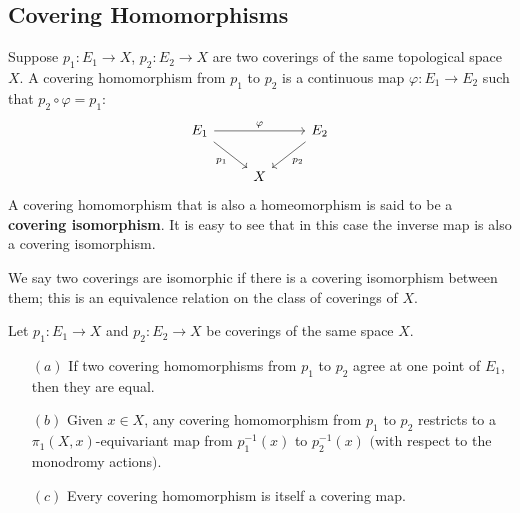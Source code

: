 \subsection{Covering Homomorphisms}
Suppose $p_1:E_1\to X$, $p_2:E_2\to X$ are two coverings of the same topological
space $X$. A covering homomorphism from $p_1$ to $p_2$ is a continuous map $\varphi:E_1\to E_2$ such that $p_2\circ\varphi=p_1$:
\[\begin{tikzcd}
E_1\ar[rd,swap,"p_1"]\ar[rr,"\varphi"]&&E_2\ar[ld,"p_2"]\\
&X&
\end{tikzcd}\]
A covering homomorphism that is also a homeomorphism is said to be a \textbf{covering
isomorphism}. It is easy to see that in this case the inverse map is also a covering isomorphism.\par
We say two coverings are isomorphic if there is a covering isomorphism between them; this is an equivalence relation on the class of coverings of $X$.
\begin{proposition}\label{covering homo}
Let $p_1:E_1\to X$ and $p_2:E_2\to X$ be coverings of the same space $X$.
\begin{itemize}
\item[$(a)$] If two covering homomorphisms from $p_1$ to $p_2$ agree at one point of $E_1$, then they are equal.
\item[$(b)$] Given $x\in X$, any covering homomorphism from $p_1$ to $p_2$ restricts to a $\pi_1(X,x)$-equivariant map from $p_1^{-1}(x)$ to $p^{-1}_2(x)$ $($with respect to the monodromy actions$)$.
\item[$(c)$] Every covering homomorphism is itself a covering map.
\end{itemize}
\end{proposition}
